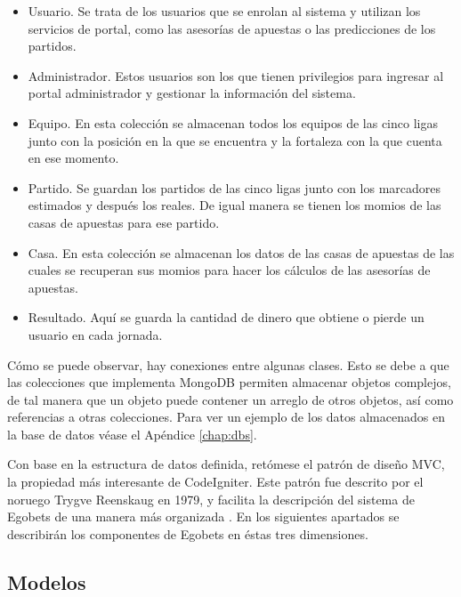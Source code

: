 	\begin{itemize}
		\item Usuario. Se trata de los usuarios que se enrolan al sistema y utilizan los servicios de portal, como las asesorías de apuestas o las predicciones de los partidos.
		\item Administrador. Estos usuarios son los que tienen privilegios para ingresar al portal administrador y gestionar la información del sistema.
		\item Equipo. En esta colección se almacenan todos los equipos de las cinco ligas junto con la posición en la que se encuentra  y la fortaleza con la que cuenta en ese momento.
		\item Partido. Se guardan los partidos de las cinco ligas junto con los marcadores estimados y después los reales. De igual manera se tienen los momios de las casas de apuestas para ese partido.
		\item Casa. En esta colección se almacenan los datos de las casas de apuestas de las cuales se recuperan sus momios para hacer los cálculos de las asesorías de apuestas.
		\item Resultado. Aquí se guarda la cantidad de dinero que obtiene o pierde un usuario en cada jornada.
	\end{itemize}

	Cómo se puede observar, hay conexiones entre algunas clases. Esto se debe a que las colecciones que implementa MongoDB permiten almacenar objetos complejos, de tal manera que un objeto puede contener un arreglo de otros objetos, así como referencias a otras colecciones. Para ver un ejemplo de los datos almacenados en la base de datos véase el Apéndice \ref{chap:dbs}.


	Con base en la estructura de datos definida, retómese el patrón de diseño MVC, la propiedad más interesante de CodeIgniter. Este patrón fue descrito por el noruego Trygve Reenskaug en 1979, y facilita la descripción del sistema de Egobets de una manera más organizada \cite{upton2007codeigniter} \cite{alfredo2005ingenieria}. En los siguientes apartados se describirán los componentes de Egobets en éstas tres dimensiones.


		 \subsection{Modelos}


